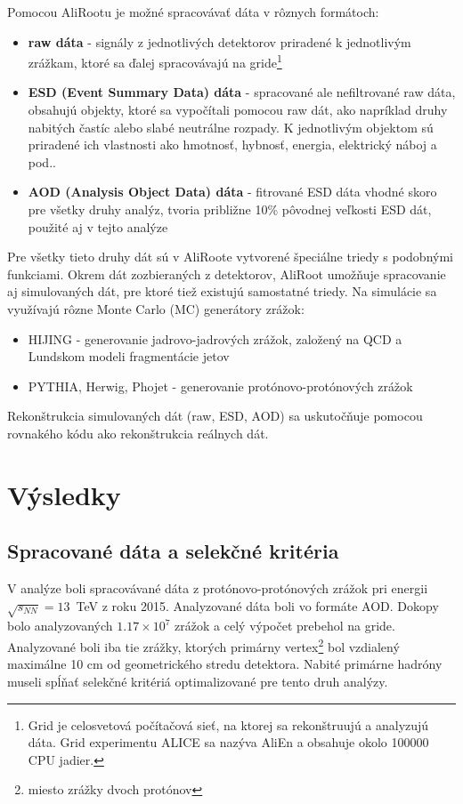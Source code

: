 \documentclass[thesismargins, thesislinespacing]{rnthesis}
\begin{document}
Pomocou AliRootu je možné spracovávať dáta v rôznych formátoch:
\begin{itemize}
	\item \textbf {raw dáta} - signály z jednotlivých detektorov priradené k jednotlivým zrážkam, ktoré sa ďalej spracovávajú na gride\footnote{Grid je celosvetová počítačová sieť, na ktorej sa rekonštruujú a analyzujú dáta. Grid experimentu ALICE sa nazýva AliEn a obsahuje okolo 100000 CPU jadier.} 
	\item \textbf {ESD (Event Summary Data) dáta} - spracované ale nefiltrované raw dáta, obsahujú objekty, ktoré sa vypočítali pomocou raw dát, ako napríklad druhy nabitých častíc alebo slabé neutrálne rozpady. K jednotlivým objektom sú priradené ich vlastnosti ako hmotnosť, hybnosť, energia, elektrický náboj a pod..
	\item \textbf {AOD (Analysis Object Data) dáta} - fitrované ESD dáta vhodné skoro pre všetky druhy analýz, tvoria približne 10\% pôvodnej veľkosti ESD dát, použité aj v tejto analýze
\end{itemize}

Pre všetky tieto druhy dát sú v AliRoote vytvorené špeciálne triedy s podobnými funkciami. Okrem dát zozbieraných z detektorov, AliRoot umožňuje spracovanie aj simulovaných dát, pre ktoré tiež existujú samostatné triedy. Na simulácie sa využívajú rôzne Monte Carlo (MC) generátory zrážok:
\begin{itemize}
	\item HIJING - generovanie jadrovo-jadrových zrážok, založený na QCD a Lundskom modeli fragmentácie jetov
	\item PYTHIA, Herwig, Phojet - generovanie protónovo-protónových zrážok
\end{itemize}

Rekonštrukcia simulovaných dát (raw, ESD, AOD) sa uskutočňuje pomocou rovnakého kódu ako rekonštrukcia reálnych dát.

\chapter{Výsledky}

\section{Spracované dáta a selekčné kritéria}
V analýze boli spracovávané dáta z protónovo-protónových zrážok pri energii $\sqrt{s_{NN}}=13$~TeV z roku 2015. Analyzované dáta boli vo formáte AOD. Dokopy bolo analyzovaných $1.17\times10^7$ zrážok a celý výpočet prebehol na gride. Analyzované boli iba tie zrážky, ktorých primárny vertex\footnote{miesto zrážky dvoch protónov} bol vzdialený maximálne 10 cm od geometrického stredu detektora. Nabité primárne hadróny museli spĺňať selekčné kritériá optimalizované pre tento druh analýzy.
\end{document}
